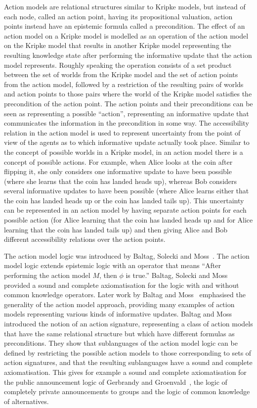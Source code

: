 Action models are relational structures similar to Kripke models, but instead of each node, called an action point, having its propositional valuation, action points instead have an epistemic formula called a precondition.
The effect of an action model on a Kripke model is modelled as an operation of the action model on the Kripke model that results in another Kripke model representing the resulting knowledge state after performing the informative update that the action model represents.
Roughly speaking the operation consists of a set product between the set of worlds from the Kripke model and the set of action points from the action model, followed by a restriction of the resulting pairs of worlds and action points to those pairs where the world of the Kripke model satisfies the precondition of the action point.
The action points and their preconditions can be seen as representing a possible ``action'', representing an informative update that communicates the information in the precondition in some way.
The accessibility relation in the action model is used to represent uncertainty from the point of view of the agents as to which informative update actually took place.
Similar to the concept of possible worlds in a Kripke model, in an action model there is a concept of possible actions.
For example, when Alice looks at the coin after flipping it, she only considers one informative update to have been possible (where she learns that the coin has landed heads up), whereas Bob considers several informative updates to have been possible (where Alice learns either that the coin has landed heads up or the coin has landed tails up).
This uncertainty can be represented in an action model by having separate action points for each possible action (for Alice learning that the coin has landed heads up and for Alice learning that the coin has landed tails up) and then giving Alice and Bob different accessibility relations over the action points.

The action model logic was introduced by Baltag, Solecki and Moss~\cite{baltag:1998, baltag:1999}.
The action model logic extends epistemic logic with an operator that means ``After performing the action model $M$, then $\phi$ is true.''
Baltag, Solecki and Moss~\cite{baltag:1998} provided a sound and complete axiomatisation for the logic with and without common knowledge operators.
Later work by Baltag and Moss~\cite{baltag:2004} emphasised the generality of the action model approach, providing many examples of action models representing various kinds of informative updates.
Baltag and Moss~\cite{baltag:2004} introduced the notion of an action signature, representing a class of action models that have the same relational structure but which have different formulas as preconditions.
They show that sublanguages of the action model logic can be defined by restricting the possible action models to those corresponding to sets of action signatures, and that the resulting sublanguages have a sound and complete axiomatisation.
This gives for example a sound and complete axiomatisation for the public announcement logic of Gerbrandy and Groenvald~\cite{gerbrandy:1997}, the logic of completely private announcements to groups and the logic of common knowledge of alternatives.

